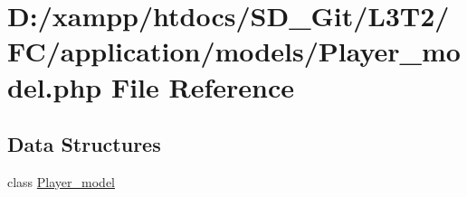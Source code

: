 \hypertarget{_player__model_8php}{}\section{D\+:/xampp/htdocs/\+S\+D\+\_\+\+Git/\+L3\+T2/\+F\+C/application/models/\+Player\+\_\+model.php File Reference}
\label{_player__model_8php}
\subsection*{Data Structures}
\begin{DoxyCompactItemize}
\item 
class \hyperlink{class_player__model}{Player\+\_\+model}
\end{DoxyCompactItemize}
